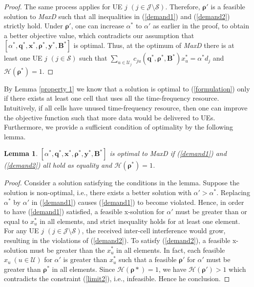 \documentclass[10pt,journal,final,finalsubmission,twocolumn]{IEEEtran}
\newtheorem{lemma}[theorem]{Lemma}
\begin{document}
\begin{proof}
The same process applies for UE $j$ $(j\in \mathcal{J}\setminus\mathcal{S})$. Therefore, $\boldsymbol{\rho}'$ is a feasible solution to {\em MaxD} such that all inequalities in (\ref{demand1}) and (\ref{demand2}) strictly hold. Under $\boldsymbol{\rho}'$, one can increase $\alpha^*$ to $\alpha '$ as earlier in the proof, to obtain a better objective value, which contradicts our assumption that $[\alpha ^*, \boldsymbol{q}^*,\boldsymbol{x}^*,\boldsymbol{\rho}^*, \boldsymbol{y}^*,\boldsymbol{B}^*]$ is optimal.
Thus, at the optimum of {\em MaxD} there is at least one UE $j$ $(j\in \mathcal{S})$ such that $\sum_{u\in \mathcal{U}_j} c_{ju}\left (\boldsymbol{q}^*,\boldsymbol{ \rho}^*, \boldsymbol{B}^*\right )x_u^*= \alpha^* d_j$ and $\mathcal{H}(\boldsymbol{\rho^*}) = 1$.
\end{proof}

By Lemma \ref{property 1} we know that a solution is optimal to (\ref{formulation}) only if there exists at least one cell that uses all the time-frequency resource. Intuitively, if all cells have unused time-frequency resource, then one can improve the objective function such that more data would be delivered to UEs. Furthermore, we provide a sufficient condition of optimality by the following lemma.

\begin{lemma}\label{property 2}
$[\alpha ^*, \boldsymbol{q}^*,\boldsymbol{x}^*,\boldsymbol{\rho}^*, \boldsymbol{y}^*,\boldsymbol{B}^*]$ is optimal to MaxD if (\ref{demand1}) and (\ref{demand2}) all hold as equality and $\mathcal{H}(\boldsymbol{\rho^*}) = 1$.
\end{lemma}
\begin{proof}
Consider a solution satisfying the conditions in the lemma. Suppose the solution is non-optimal, i.e., there exists a better solution with $\alpha'>\alpha^*$. Replacing $\alpha^*$ by $\alpha '$ in (\ref{demand1}) causes (\ref{demand1}) to become violated. Hence, in order to have (\ref{demand1}) satisfied, a feasible x-solution for $\alpha'$ must be greater than or equal to $x_u^*$ in all elements, and strict inequality holds for at least one element. For any UE $j$ $(j\in \mathcal{J}\setminus \mathcal{S})$, the received inter-cell interference would grow, resulting in the violations of (\ref{demand2}). To satisfy (\ref{demand2}), a feasible x-solution must be greater than the $x_u^*$ in all elements. In fact, each feasible $x_u\ (u\in\mathcal{U})$ for $\alpha'$ is greater than $x^*_u$ such that a feasible $\boldsymbol{\rho}'$ for $\alpha'$ must be greater than $\boldsymbol{\rho}^*$ in all elements. Since $\mathcal{H}(\boldsymbol{\rho}*)=1$, we have $\mathcal{H}(\boldsymbol{\rho}')>1$ which contradicts the constraint (\ref{limit2}), i.e., infeasible. Hence he conclusion.
\end{proof}
\end{document}
